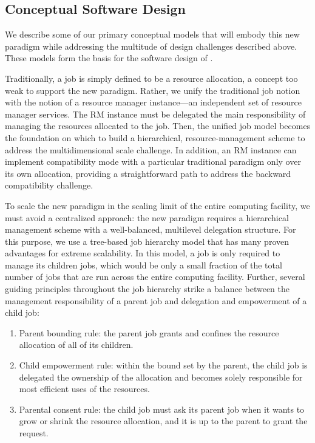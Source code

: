 \subsection{Conceptual Software Design}
We describe some of our primary conceptual models
that will embody this new paradigm while addressing
the multitude of design challenges described above.
These models form the basis for the software design
of \flux.

\vspace{1ex}
 Traditionally, a job is
simply defined to be a resource allocation, a concept
too weak to support the new paradigm. Rather, we unify
the traditional job notion with the notion of a resource
manager instance---an independent set of resource
manager services. The RM instance must be delegated
the main responsibility of managing the resources allocated
to the job. Then, the unified job model becomes
the foundation on which to build a hierarchical, 
resource-management scheme to address the multidimensional
scale challenge. In addition, an RM instance can
implement compatibility mode with a particular
traditional paradigm only over its own allocation, 
providing a straightforward path to address
the backward compatibility challenge.

\vspace{1ex}
 To scale the new paradigm
in the scaling limit of the entire computing facility, 
we must avoid a centralized approach: the new paradigm 
requires a hierarchical management scheme with a well-balanced, 
multilevel delegation structure. For this purpose, 
we use a tree-based job hierarchy model that has 
many proven advantages for extreme scalability. 
In this model, a job is only required to manage 
its children jobs, which would be only a small fraction 
of the total number of jobs that are run across 
the entire computing facility. Further, several guiding 
principles throughout the job hierarchy strike 
a balance between the management responsibility 
of a parent job and delegation and empowerment 
of a child job:

\begin{enumerate}
\item{Parent bounding rule: the parent job grants 
and confines the resource allocation of all of its children.}

\item{Child empowerment rule: within the bound set 
by the parent, the child job is delegated the ownership 
of the allocation and becomes solely responsible 
for most efficient uses of the resources.}

\item{Parental consent rule: the child job must ask 
its parent job when it wants to grow or shrink the resource 
allocation, and it is up to the parent to grant the request.}
\end{enumerate}


